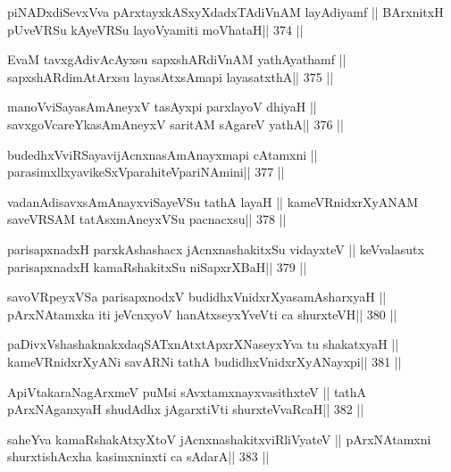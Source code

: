 \begin{shl}
piNADxdiSevxVva pArxtayxkASxyXdadxTAdiVnAM layAdiyamf ||
BArxnitxH pUveVRSu kAyeVRSu layoV\s yamiti moVhataH\hfill || 374 ||
\end{shl}

\begin{shl}
EvaM tavxgAdivAcAyxsu sapxshARdiVnAM yathAyathamf ||
sapxshARdimAtArxsu layasAtxsAmapi layasatxthA\hfill || 375 ||
\end{shl}

\begin{shl}
manoVviSayasAmAneyxV tasAyxpi parxlayoV dhiyaH ||
savxgoVcareYkasAmAneyxV saritAM sAgareV yathA\hfill || 376 ||
\end{shl}

\begin{shl}
budedhxVviRSayavijAcnxnasAmAnayxmapi cA\s\s tamxni ||
parasimxllxyavikeSxVparahiteV\s pariNAmini\hfill || 377 ||
\end{shl}

\begin{shl}
vadanAdisavxsAmAnayxviSayeVSu tathA layaH ||
kameVRnidxrXyANAM saveVRSAM tatAsxmAneyxVSu pacnacxsu\hfill || 378 ||
\end{shl}

\begin{shl}
parisapxnadxH parxkAshashacx jAcnxnashakitxSu vidayxteV ||
keVvalasutx parisapxnadxH kamaRshakitxSu niSapxrXBaH\hfill || 379 ||
\end{shl}

\begin{shl}
savoVR\s peyxVSa parisapxnodxV budidhxVnidxrXyasamAsharxyaH ||
pArxNAtamxka iti jeVcnxyoV hanAtxseyxYveVti ca shurxteVH\hfill || 380 ||
\end{shl}

\begin{shl}
paDivxVshashaknakxdaqSATxnAtxtApxrXNaseyxYva tu shakatxyaH ||
kameVRnidxrXyANi savARNi tathA budidhxVnidxrXyANayxpi\hfill || 381 ||
\end{shl}

\begin{shl}
ApiVtakaraNagArxmeV puMsi sAvxtamxnayxvasithxteV ||
tathA pArxNAganxyaH shudAdhx jAgarxtiVti shurxteVvaRcaH\hfill || 382 ||
\end{shl}

\begin{shl}
saheYva kamaRshakAtxyX\s toV jAcnxnashakitxviRliVyateV ||
pArxNAtamxni shurxtishAcx\s\s ha kasimxninxti ca sAdarA\hfill || 383 ||
\end{shl}

